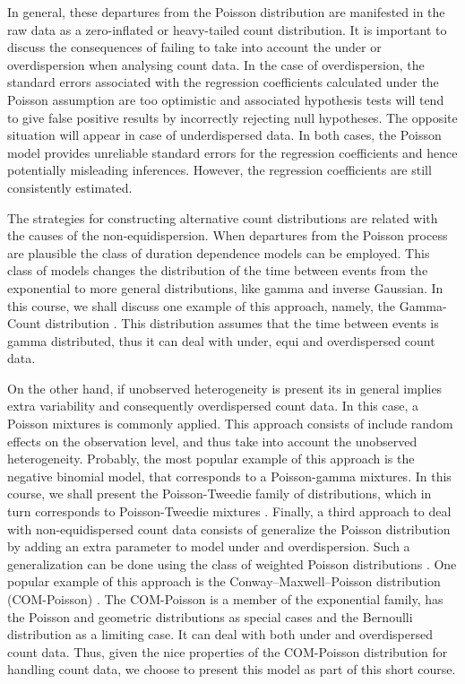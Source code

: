 \documentclass[9pt,a5paper,]{book}
\theoremstyle{definition}
\theoremstyle{definition}
\theoremstyle{remark}
\begin{document}
In general, these departures from the Poisson distribution are
manifested in the raw data as a zero-inflated or heavy-tailed count
distribution. It is important to discuss the consequences of failing to
take into account the under or overdispersion when analysing count data.
In the case of overdispersion, the standard errors associated with the
regression coefficients calculated under the Poisson assumption are too
optimistic and associated hypothesis tests will tend to give false
positive results by incorrectly rejecting null hypotheses. The opposite
situation will appear in case of underdispersed data. In both cases, the
Poisson model provides unreliable standard errors for the regression
coefficients and hence potentially misleading inferences. However, the
regression coefficients are still consistently estimated.

The strategies for constructing alternative count distributions are
related with the causes of the non-equidispersion. When departures from
the Poisson process are plausible the class of duration dependence
models \citep{Winkelmann2003} can be employed. This class of models
changes the distribution of the time between events from the exponential
to more general distributions, like gamma and inverse Gaussian. In this
course, we shall discuss one example of this approach, namely, the
Gamma-Count distribution \citep{Zeviani2014}. This distribution assumes
that the time between events is gamma distributed, thus it can deal with
under, equi and overdispersed count data.

On the other hand, if unobserved heterogeneity is present its in general
implies extra variability and consequently overdispersed count data. In
this case, a Poisson mixtures is commonly applied. This approach
consists of include random effects on the observation level, and thus
take into account the unobserved heterogeneity. Probably, the most
popular example of this approach is the negative binomial model, that
corresponds to a Poisson-gamma mixtures. In this course, we shall
present the Poisson-Tweedie family of distributions, which in turn
corresponds to Poisson-Tweedie mixtures
\citep{Bonat2016b, Jorgensen2014}. Finally, a third approach to deal
with non-equidispersed count data consists of generalize the Poisson
distribution by adding an extra parameter to model under and
overdispersion. Such a generalization can be done using the class of
weighted Poisson distributions \citep{DelCastillo1998}. One popular
example of this approach is the Conway--Maxwell--Poisson distribution
(COM-Poisson) \citep{Sellers2010}. The COM-Poisson is a member of the
exponential family, has the Poisson and geometric distributions as
special cases and the Bernoulli distribution as a limiting case. It can
deal with both under and overdispersed count data. Thus, given the nice
properties of the COM-Poisson distribution for handling count data, we
choose to present this model as part of this short course.
\end{document}
